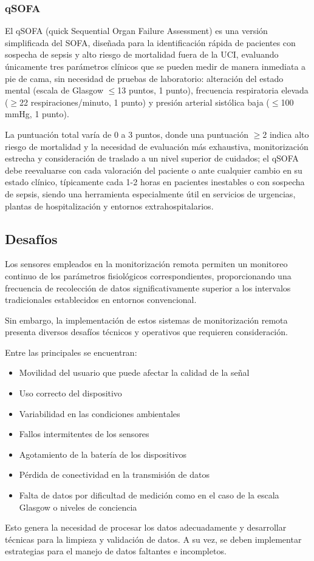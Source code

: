 \newpage
\subsubsection{qSOFA}
El qSOFA (quick Sequential Organ Failure Assessment) es una versión simplificada del SOFA, diseñada para la identificación rápida de pacientes con sospecha de sepsis y alto riesgo de mortalidad fuera de la UCI, 
evaluando únicamente tres parámetros clínicos que se pueden medir de manera inmediata a pie de cama, sin necesidad de pruebas de laboratorio: 
alteración del estado mental (escala de Glasgow $\leq$13 puntos, 1 punto), frecuencia respiratoria elevada ($\geq$22 respiraciones/minuto, 1 punto) y presión arterial sistólica baja ($\leq$100 mmHg, 1 punto).\newline

La puntuación total varía de 0 a 3 puntos, donde una puntuación $\geq$2 indica alto riesgo de mortalidad y la necesidad de evaluación más exhaustiva, monitorización estrecha
y consideración de traslado a un nivel superior de cuidados; el qSOFA debe reevaluarse con cada valoración del paciente o ante cualquier cambio en su estado clínico, 
típicamente cada 1-2 horas en pacientes inestables o con sospecha de sepsis, siendo una herramienta especialmente útil en servicios de urgencias, plantas de hospitalización y entornos extrahospitalarios.

\newpage

\subsection{Desafíos}

Los sensores empleados en la monitorización remota permiten un monitoreo continuo de los parámetros fisiológicos correspondientes, 
proporcionando una frecuencia de recolección de datos significativamente superior a los intervalos tradicionales establecidos en entornos convencional. \newline

Sin embargo, la implementación de estos sistemas de monitorización remota presenta diversos desafíos técnicos y operativos que requieren consideración. \newline

Entre las principales se encuentran:

\begin{itemize}
    \item Movilidad del usuario que puede afectar la calidad de la señal
    \item Uso correcto del dispositivo
    \item Variabilidad en las condiciones ambientales
    \item Fallos intermitentes de los sensores
    \item Agotamiento de la batería de los dispositivos
    \item Pérdida de conectividad en la transmisión de datos
    \item Falta de datos por dificultad de medición como en el caso de la escala Glasgow o niveles de conciencia
\end{itemize}

Esto genera la necesidad de procesar los datos adecuadamente y desarrollar técnicas para la limpieza y validación de datos.
A su vez, se deben implementar estrategias para el manejo de datos faltantes e incompletos. \parencite{rpm_pm}
